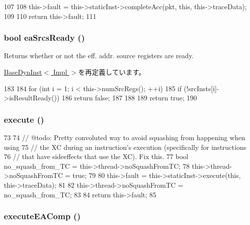 \begin{DoxyCode}
107 {
108     this->fault = this->staticInst->completeAcc(pkt, this, this->traceData);
109 
110     return this->fault;
111 }
\end{DoxyCode}
\hypertarget{classOzoneDynInst_ae3a07556a5b5d8248cbfb1c99561340d}{
\subsubsection[{eaSrcsReady}]{\setlength{\rightskip}{0pt plus 5cm}bool eaSrcsReady ()}}
\label{classOzoneDynInst_ae3a07556a5b5d8248cbfb1c99561340d}
Returns whether or not the eff. addr. source registers are ready. 

\hyperlink{classBaseDynInst_ae3a07556a5b5d8248cbfb1c99561340d}{BaseDynInst$<$ Impl $>$}を再定義しています。


\begin{DoxyCode}
183 {
184     for (int i = 1; i < this->numSrcRegs(); ++i) {
185         if (!srcInsts[i]->isResultReady())
186             return false;
187     }
188 
189     return true;
190 }
\end{DoxyCode}
\hypertarget{classOzoneDynInst_a1a8de76be7ad0985553c5bae9f26a55b}{
\subsubsection[{execute}]{ execute ()}}
\label{classOzoneDynInst_a1a8de76be7ad0985553c5bae9f26a55b}



\begin{DoxyCode}
73 {
74     // @todo: Pretty convoluted way to avoid squashing from happening when using
75     // the XC during an instruction's execution (specifically for instructions
76     // that have sideeffects that use the XC).  Fix this.
77     bool no_squash_from_TC = this->thread->noSquashFromTC;
78     this->thread->noSquashFromTC = true;
79 
80     this->fault = this->staticInst->execute(this, this->traceData);
81 
82     this->thread->noSquashFromTC = no_squash_from_TC;
83 
84     return this->fault;
85 }
\end{DoxyCode}
\hypertarget{classOzoneDynInst_a336d06f2ef8e1ec90d159cb7183f3e5a}{
\subsubsection[{executeEAComp}]{ executeEAComp ()}}
\label{classOzoneDynInst_a336d06f2ef8e1ec90d159cb7183f3e5a}




